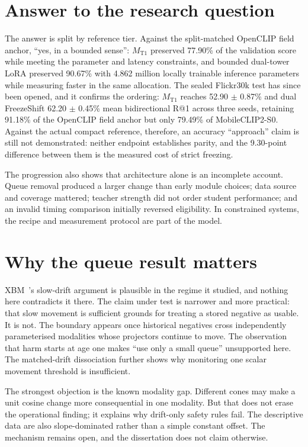 \documentclass[11pt,a4paper,oneside]{report}
\newcommand{\MTone}{\ensuremath{M_{\mathrm{T1}}}}
\begin{document}
\section{Answer to the research question}
The answer is split by reference tier. Against the split-matched OpenCLIP field anchor, ``yes, in a bounded sense'': \MTone{} preserved 77.90\% of the validation score while meeting the parameter and latency constraints, and bounded dual-tower LoRA preserved 90.67\% with 4.862 million locally trainable inference parameters while measuring faster in the same allocation. The sealed Flickr30k test has since been opened, and it confirms the ordering: \MTone{} reaches 52.90 $\pm$ 0.87\% and dual FreezeShift 62.20 $\pm$ 0.45\% mean bidirectional R@1 across three seeds, retaining 91.18\% of the OpenCLIP field anchor but only 79.49\% of MobileCLIP2-S0. Against the actual compact reference, therefore, an accuracy ``approach'' claim is still not demonstrated: neither endpoint establishes parity, and the 9.30-point difference between them is the measured cost of strict freezing.

The progression also shows that architecture alone is an incomplete account. Queue removal produced a larger change than early module choices; data source and coverage mattered; teacher strength did not order student performance; and an invalid timing comparison initially reversed eligibility. In constrained systems, the recipe and measurement protocol are part of the model.

\section{Why the queue result matters}
XBM~\cite{wang2020xbm}'s slow-drift argument is plausible in the regime it studied, and nothing here contradicts it there. The claim under test is narrower and more practical: that slow movement is sufficient grounds for treating a stored negative as usable. It is not. The boundary appears once historical negatives cross independently parameterised modalities whose projectors continue to move. The observation that harm starts at age one makes ``use only a small queue'' unsupported here. The matched-drift dissociation further shows why monitoring one scalar movement threshold is insufficient.

The strongest objection is the known modality gap. Different cones may make a unit cosine change more consequential in one modality. But that does not erase the operational finding; it explains why drift-only safety rules fail. The descriptive data are also slope-dominated rather than a simple constant offset. The mechanism remains open, and the dissertation does not claim otherwise.
\end{document}
